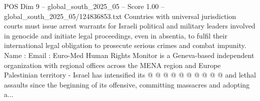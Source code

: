 \begin{textsample}{POS Dim 9 – global\_south\_2025\_05 – Score 1.00 – global\_south\_2025\_05/124836853.txt}
Countries with universal jurisdiction courts must issue arrest warrants for Israeli political and military leaders involved in genocide and initiate legal proceedings, even in absentia, to fulfil their international legal obligation to prosecute serious crimes and combat impunity.
Name : Email : Euro-Med Human Rights Monitor is a Geneva-based independent organization with regional offices across the MENA region and Europe Palestinian territory - Israel has intensified its @ @ @ @ @ @ @ @ @ @ and lethal assaults since the beginning of its offensive, committing massacres and adopting a...

\end{textsample}

